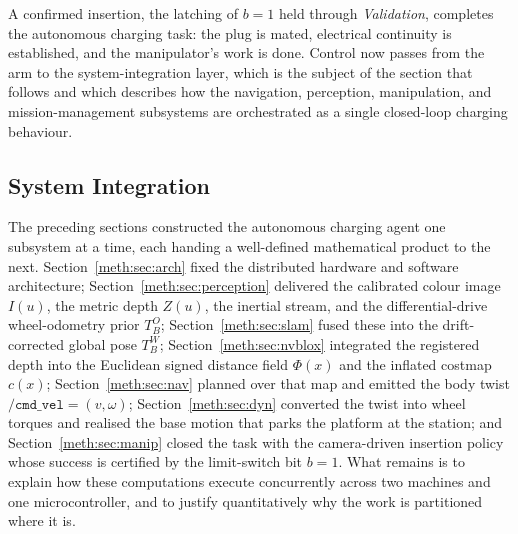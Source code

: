 A confirmed insertion, the latching of $b=1$ held through \emph{Validation}, completes the autonomous charging task: the plug is mated, electrical continuity is established, and the manipulator's work is done. Control now passes from the arm to the system-integration layer, which is the subject of the section that follows and which describes how the navigation, perception, manipulation, and mission-management subsystems are orchestrated as a single closed-loop charging behaviour.


\subsection{System Integration}\label{meth:sec:integration}

The preceding sections constructed the autonomous charging agent one subsystem at a time, each handing a well-defined mathematical product to the next. Section~\ref{meth:sec:arch} fixed the distributed hardware and software architecture; Section~\ref{meth:sec:perception} delivered the calibrated colour image $I(u)$, the metric depth $Z(u)$, the inertial stream, and the differential-drive wheel-odometry prior $T^{O}_{B}$; Section~\ref{meth:sec:slam} fused these into the drift-corrected global pose $T^{W}_{B}$; Section~\ref{meth:sec:nvblox} integrated the registered depth into the Euclidean signed distance field $\Phi(x)$ and the inflated costmap $c(x)$; Section~\ref{meth:sec:nav} planned over that map and emitted the body twist $\texttt{/cmd\_vel}=(v,\omega)$; Section~\ref{meth:sec:dyn} converted the twist into wheel torques and realised the base motion that parks the platform at the station; and Section~\ref{meth:sec:manip} closed the task with the camera-driven insertion policy whose success is certified by the limit-switch bit $b=1$. What remains is to explain how these computations execute concurrently across two machines and one microcontroller, and to justify quantitatively why the work is partitioned where it is.

